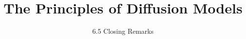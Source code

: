 ﻿%

\graphicspath{{../images/}}
\title{The Principles of Diffusion Models}
\subtitle{6.5 Closing Remarks}


\begin{frame}
    \titlepage
\end{frame}




